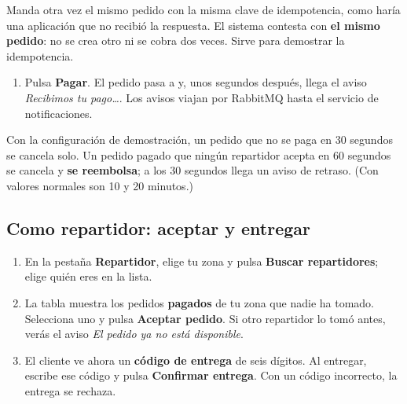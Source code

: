 \documentclass[11pt]{article}
\begin{document}
\begin{nota}
Manda otra vez el mismo pedido con la misma clave de idempotencia, como haría una aplicación que no
recibió la respuesta. El sistema contesta con \textbf{el mismo pedido}: no se crea otro ni se cobra dos
veces. Sirve para demostrar la idempotencia.
\end{nota}

\begin{enumerate}[resume]
  \item Pulsa \textbf{Pagar}. El pedido pasa a  y, unos segundos después, llega el aviso
        \emph{Recibimos tu pago\ldots}. Los avisos viajan por RabbitMQ hasta el servicio de notificaciones.
\end{enumerate}

\begin{nota}
Con la configuración de demostración, un pedido que no se paga en 30 segundos se cancela solo. Un pedido
pagado que ningún repartidor acepta en 60 segundos se cancela y \textbf{se reembolsa}; a los 30 segundos
llega un aviso de retraso. (Con valores normales son 10 y 20 minutos.)
\end{nota}

\subsection{Como repartidor: aceptar y entregar}
\begin{enumerate}
  \item En la pestaña \textbf{Repartidor}, elige tu zona y pulsa \textbf{Buscar repartidores}; elige quién
        eres en la lista.
  \item La tabla muestra los pedidos \textbf{pagados} de tu zona que nadie ha tomado. Selecciona uno y pulsa
        \textbf{Aceptar pedido}. Si otro repartidor lo tomó antes, verás el aviso
        \emph{El pedido ya no está disponible}.
  \item El cliente ve ahora un \textbf{código de entrega} de seis dígitos. Al entregar, escribe ese código y
        pulsa \textbf{Confirmar entrega}. Con un código incorrecto, la entrega se rechaza.
\end{enumerate}
\end{document}
